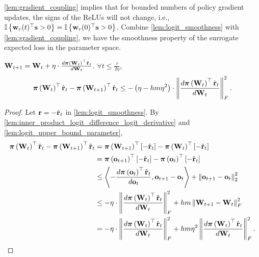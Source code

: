\cref{lem:gradient_coupling} implies that for bounded numbers of policy gradient updates, the signs of the ReLUs will not change, i.e., ${\mathbb{I}}\left\{ {\mathbf{w}}_r(t)^\top {\mathbf{s}} > 0 \right\} = {\mathbb{I}}\left\{ {\mathbf{w}}_r(0)^\top {\mathbf{s}} > 0 \right\}$. Combine \cref{lem:logit_smoothness} with \cref{lem:gradient_coupling}, we have the smoothness property of the surrogate expected loss in the parameter space.
\begin{lem}
\label{lem:empirically_expected_reward_parameter_smoothness}
    ${\mathbf{W}}_{t+1} = {\mathbf{W}}_t + \eta \cdot \frac{d {\boldsymbol{\pi}}\left({\mathbf{W}}_t\right)^\top \hat{{\mathbf{r}}}_t}{d {\mathbf{W}}_t}$. $\forall t \le \frac{\tau}{ 2 \eta }$,
\begin{equation}
\label{eq:parameter_smoothness}
\begin{split}
    {\boldsymbol{\pi}}\left( {\mathbf{W}}_t \right)^\top \hat{{\mathbf{r}}}_t - {\boldsymbol{\pi}}\left( {\mathbf{W}}_{t+1} \right)^\top \hat{{\mathbf{r}}}_t \le - \left( \eta - h m \eta^2 \right) \cdot \left\| \frac{d {\boldsymbol{\pi}}\left( {\mathbf{W}}_t \right)^\top \hat{{\mathbf{r}}}_t}{d {\mathbf{W}}_t} \right\|_F^2.
\end{split}
\end{equation}
\end{lem}
\begin{proof}
   Let ${\mathbf{r}} = - \hat{{\mathbf{r}}}_t$ in \cref{lem:logit_smoothness}. By \cref{lem:inner_product_logit_difference_logit_derivative} and \cref{lem:logit_upper_bound_parameter},
\begin{equation*}
\begin{split}
    {\boldsymbol{\pi}}\left( {\mathbf{W}}_t \right)^\top \hat{{\mathbf{r}}}_t - {\boldsymbol{\pi}}\left( {\mathbf{W}}_{t+1} \right)^\top \hat{{\mathbf{r}}}_t &= {\boldsymbol{\pi}}\left( {\mathbf{W}}_{t+1} \right)^\top \left[ - \hat{{\mathbf{r}}}_t \right] - {\boldsymbol{\pi}}\left( {\mathbf{W}}_t \right)^\top \left[ - \hat{{\mathbf{r}}}_t \right]  \\
    &= {\boldsymbol{\pi}}\left( {\mathbf{o}}_{t+1} \right)^\top \left[ - \hat{{\mathbf{r}}}_t \right] - {\boldsymbol{\pi}}\left( {\mathbf{o}}_t \right)^\top \left[ - \hat{{\mathbf{r}}}_t \right] \\
    &\le \left\langle - \frac{d {\boldsymbol{\pi}}\left( {\mathbf{o}}_t \right)^\top \hat{{\mathbf{r}}}_t}{d {\mathbf{o}}_t}, {\mathbf{o}}_{t+1} - {\mathbf{o}}_t \right\rangle + \left\| {\mathbf{o}}_{t+1} - {\mathbf{o}}_t  \right\|_2^2 \\
    &\le - \eta \cdot \left\| \frac{d {\boldsymbol{\pi}}\left({\mathbf{W}}_t\right)^\top \hat{{\mathbf{r}}}_t}{d {\mathbf{W}}_t} \right\|_F^2 + h m \left\| {\mathbf{W}}_{t+1} - {\mathbf{W}}_t \right\|_F^2 \\
    &= - \eta \cdot \left\| \frac{d {\boldsymbol{\pi}}\left({\mathbf{W}}_t\right)^\top \hat{{\mathbf{r}}}_t}{d {\mathbf{W}}_t} \right\|_F^2 + h m \eta^2 \left\| \frac{d {\boldsymbol{\pi}}\left({\mathbf{W}}_t\right)^\top \hat{{\mathbf{r}}}_t}{d {\mathbf{W}}_t} \right\|_F^2. \qedhere
\end{split}
\end{equation*}
\end{proof}

